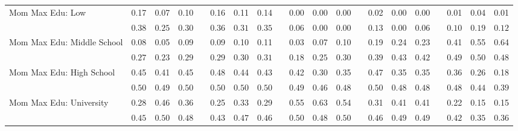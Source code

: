 \begin{center}
{\begin{longtable}{L{6cm} c c c p{.5cm} c c c p{.5cm} c c c p{.5cm} c c c p{.5cm} c c c}
 \quad Mom Max Edu: Low & 0.17 &      0.07 &      0.10 & &      0.16 &      0.11 &      0.14 & &      0.00 &      0.00 &      0.00 & &      0.02 &      0.00 &      0.00 & &      0.01 &      0.04 &      0.01 \\*
 \quad & $\mathit{     0.38}$ & $\mathit{     0.25}$ & $\mathit{     0.30}$ & & $\mathit{     0.36}$ & $\mathit{     0.31}$ & $\mathit{     0.35}$ & & $\mathit{     0.06}$ & $\mathit{     0.00}$ & $\mathit{     0.00}$ & & $\mathit{     0.13}$ & $\mathit{     0.00}$ & $\mathit{     0.06}$ & & $\mathit{     0.10}$ & $\mathit{     0.19}$ & $\mathit{     0.12}$ \\[.2em]
 \quad Mom Max Edu: Middle School & 0.08 &      0.05 &      0.09 & &      0.09 &      0.10 &      0.11 & &      0.03 &      0.07 &      0.10 & &      0.19 &      0.24 &      0.23 & &      0.41 &      0.55 &      0.64 \\*
 \quad & $\mathit{     0.27}$ & $\mathit{     0.23}$ & $\mathit{     0.29}$ & & $\mathit{     0.29}$ & $\mathit{     0.30}$ & $\mathit{     0.31}$ & & $\mathit{     0.18}$ & $\mathit{     0.25}$ & $\mathit{     0.30}$ & & $\mathit{     0.39}$ & $\mathit{     0.43}$ & $\mathit{     0.42}$ & & $\mathit{     0.49}$ & $\mathit{     0.50}$ & $\mathit{     0.48}$ \\[.2em]
 \quad Mom Max Edu: High School & 0.45 &      0.41 &      0.45 & &      0.48 &      0.44 &      0.43 & &      0.42 &      0.30 &      0.35 & &      0.47 &      0.35 &      0.35 & &      0.36 &      0.26 &      0.18 \\*
 \quad & $\mathit{     0.50}$ & $\mathit{     0.49}$ & $\mathit{     0.50}$ & & $\mathit{     0.50}$ & $\mathit{     0.50}$ & $\mathit{     0.50}$ & & $\mathit{     0.49}$ & $\mathit{     0.46}$ & $\mathit{     0.48}$ & & $\mathit{     0.50}$ & $\mathit{     0.48}$ & $\mathit{     0.48}$ & & $\mathit{     0.48}$ & $\mathit{     0.44}$ & $\mathit{     0.39}$ \\[.2em]
 \quad Mom Max Edu: University & 0.28 &      0.46 &      0.36 & &      0.25 &      0.33 &      0.29 & &      0.55 &      0.63 &      0.54 & &      0.31 &      0.41 &      0.41 & &      0.22 &      0.15 &      0.15 \\*
 \quad & $\mathit{     0.45}$ & $\mathit{     0.50}$ & $\mathit{     0.48}$ & & $\mathit{     0.43}$ & $\mathit{     0.47}$ & $\mathit{     0.46}$ & & $\mathit{     0.50}$ & $\mathit{     0.48}$ & $\mathit{     0.50}$ & & $\mathit{     0.46}$ & $\mathit{     0.49}$ & $\mathit{     0.49}$ & & $\mathit{     0.42}$ & $\mathit{     0.35}$ & $\mathit{     0.36}$ \\[.2em]

\end{longtable}}
\end{center}
